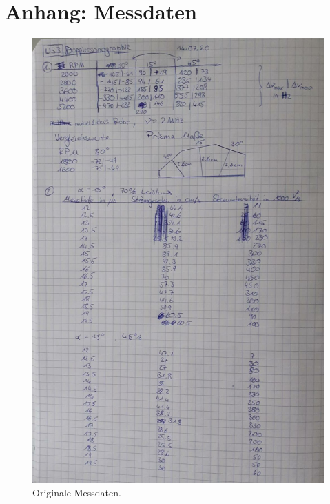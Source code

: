 \newpage
\section*{Anhang: Messdaten}

\begin{figure}
    \centering
    \includegraphics[width=.8\textwidth]{data/data.jpeg}    
    \caption{Originale Messdaten.}
\end{figure}